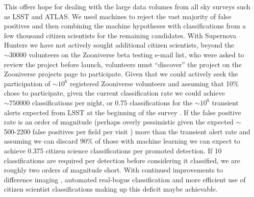 \documentclass[a4paper,fleqn,usenatbib]{mnras}
\begin{document}
This offers hope for dealing with the large data volumes from all sky surveys such as LSST and ATLAS.  We used machines to reject the vast majority of false positives and then combining the machine hypotheses with classifications from a few thousand citizen scientists for the remaining candidates.  With Supernova Hunters we have not actively sought additional citizen scientists, beyond the $\sim30000$ volunteers on the Zooniverse beta testing e-mail list, who were asked to review the project before launch, volunteers must ``discover'' the project on the Zooniverse projects page to participate.  Given that we could actively seek the participation of $\sim 10^6$ registered Zooniverse volunteers and assuming that 10\% chose to participate, given the current classification rate we could achieve $\sim 750000$ classifications per night, or 0.75 classifications for the $\sim 10^6$ transient alerts expected from LSST at the beginning of the survey \citep{Ridgway14}.  If the false positive rate is an order of magnitude (perhaps overly pessimistic given the expected $\sim$ 500-2200 false positives per field per visit \citep{Ridgway14}) more than the transient alert rate and assuming we can discard 90\% of those with machine learning we can expect to achieve 0.375 citizen science classifications per promoted detection.  If 10 classifications are required per detection before considering it classified, we are roughly two orders of magnitude short.  With continued improvements to difference imaging \citep{Zackay16}, automated real-bogus classification and more efficient use of citizen scientist classifications making up this deficit maybe achievable.

 

\end{document}
